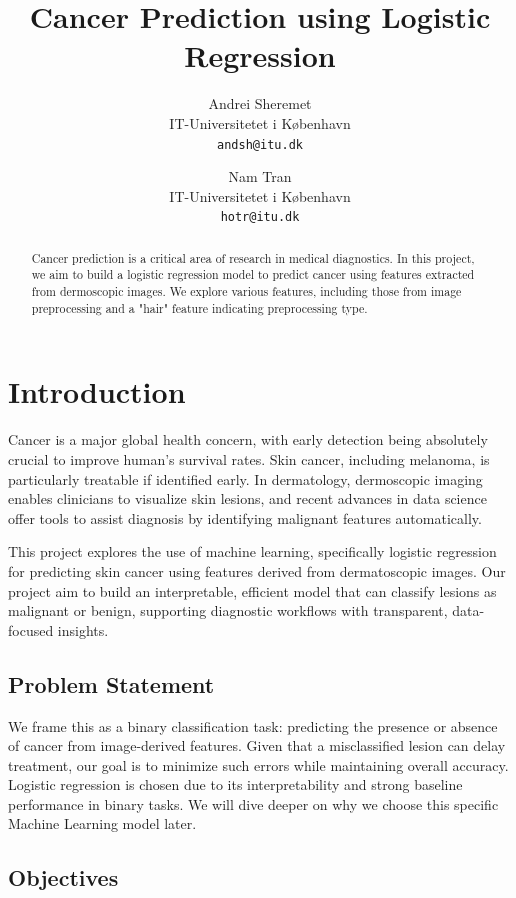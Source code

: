 \documentclass[10pt,twocolumn]{article}
\title{Cancer Prediction using Logistic Regression}
\author{
    Andrei Sheremet \\
    IT-Universitetet i København \\
    \texttt{andsh@itu.dk}
    \and
    Nam Tran \\
    IT-Universitetet i København \\
    \texttt{hotr@itu.dk}
}
\date{}
\begin{document}
\maketitle

\begin{abstract}
Cancer prediction is a critical area of research in medical diagnostics. In this project, we aim to build a logistic regression model to predict cancer using features extracted from dermoscopic images. We explore various features, including those from image preprocessing and a "hair" feature indicating preprocessing type.
\end{abstract}

\section{Introduction}

Cancer is a major global health concern, with early detection being absolutely crucial to improve human's survival rates. Skin cancer, including melanoma, is particularly treatable if identified early. In dermatology, dermoscopic imaging enables clinicians to visualize skin lesions, and recent advances in data science offer tools to assist diagnosis by identifying malignant features automatically.

This project explores the use of machine learning, specifically logistic regression for predicting skin cancer using features derived from dermatoscopic images. Our project aim to build an interpretable, efficient model that can classify lesions as malignant or benign, supporting diagnostic workflows with transparent, data-focused insights.

\subsection*{Problem Statement}

We frame this as a binary classification task: predicting the presence or absence of cancer from image-derived features. Given that a misclassified lesion can delay treatment, our goal is to minimize such errors while maintaining overall accuracy. Logistic regression is chosen due to its interpretability and strong baseline performance in binary tasks. We will dive deeper on why we choose this specific Machine Learning model later.

\subsection*{Objectives}
\end{document}
